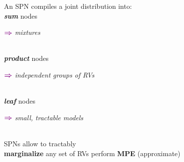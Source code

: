 \documentclass[xcolor={usenames,dvipsnames,svgnames}, compress, aspectratio=169, 11pt]{beamer}
\newcommand{\comment}[3][\small]{\begin{minipage}{1\linewidth}
          \raggedleft
          {
            $\color{violet}\boldsymbol\Rightarrow$
            #1
            {\emph{#2}}
          }
      \end{minipage}#3\\
}
\begin{document}
\begin{frame}[t, htt=bgrey2]
    
    
    
  \hfill\begin{minipage}[t]{0.65\linewidth}
    \vspace{-120pt}
    \raggedright
    An SPN compiles a joint distribution into:\\[10pt]
    \emph{\textbf{sum}} nodes \hspace{-100pt}\comment[\small]{mixtures}{}
    \emph{\textbf{product}} nodes \hspace{-100pt}\comment[\small]{independent groups of RVs}{}
    \emph{\textbf{leaf}} nodes\hspace{-100pt}
    \comment[\small]{small, tractable models}{}    
    SPNs allow to tractably\\[10pt]
    \textbf{marginalize} any set of RVs    
    perform \textbf{MPE} (approximate)
  \end{minipage}
\end{frame}
\end{document}
